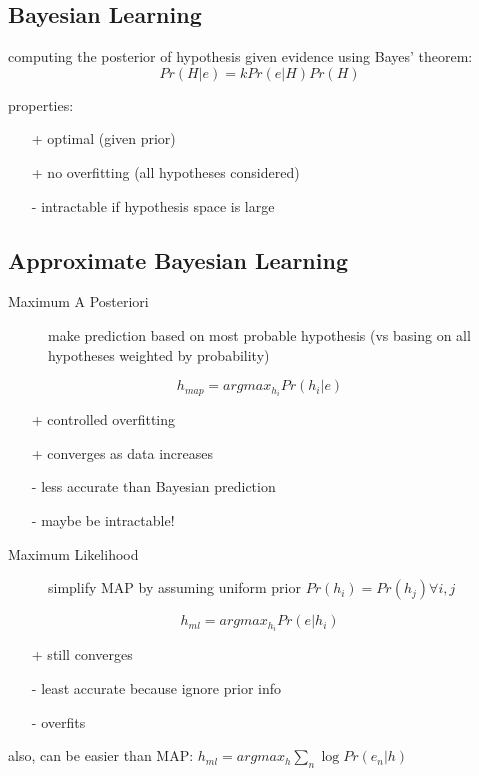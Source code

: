 \documentclass[]{article}
\theoremstyle{definition}
\begin{document}
    \subsection{Bayesian Learning}
    \label{sub:bayesian_learning}

    computing the posterior of hypothesis given evidence using Bayes' theorem:
    \begin{equation*}
        Pr(H|e) = k Pr(e|H) Pr(H)
    \end{equation*}

    properties:
    \begin{itemize}
        \item[+] optimal (given prior)
        \item[+] no overfitting (all hypotheses considered)
        \item[-] intractable if hypothesis space is large
    \end{itemize}
    
    \subsection{Approximate Bayesian Learning}
    \label{sub:approximate_bayesian_learning}
    
    \begin{description}
        \item[Maximum A Posteriori] make prediction based on most probable hypothesis (vs basing on all hypotheses weighted by probability)
    \end{description}
    \begin{equation*}
        h_{map} = argmax_{h_i} Pr(h_i | e)
    \end{equation*}
    \begin{itemize}
        \item[+] controlled overfitting
        \item[+] converges as data increases
        \item[-] less accurate than Bayesian prediction
        \item[-] maybe be intractable!
    \end{itemize}

    \begin{description}
        \item[Maximum Likelihood] simplify MAP by assuming uniform prior $Pr(h_i) = Pr(h_j) \forall i,j$
    \end{description}
    \begin{equation*}
        h_{ml} = argmax_{h_i} Pr(e | h_i)
    \end{equation*}
    \begin{itemize}
        \item[+] still converges
        \item[-] least accurate because ignore prior info
        \item[-] overfits
    \end{itemize}
    also, can be easier than MAP: $h_{ml} = argmax_h \sum_n \log Pr(e_n|h)$
    
\end{document}

